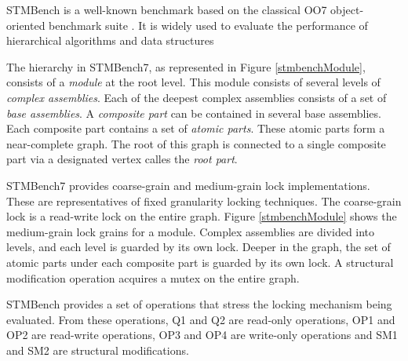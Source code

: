 STMBench is a well-known benchmark based on the classical OO7 object-oriented benchmark suite \cite{CareyDN93}. It is widely used to evaluate the performance of hierarchical algorithms and data structures \cite{prokopec_renaissance_2019,vale_pot_2016, felber_hardware_2016, carvalho_optimizing_2016, kim_scheduling_2015,filipe_nested_2015,rito_props_2014,kalikar2016domlock,anjuMID,FlexiGran2024,KalikarN18,GaneshKN18,liu_unleashing_2014} 

The hierarchy in STMBench7, as represented in Figure \ref{stmbenchModule}, consists of a \emph{module} at the root level. This module consists of several levels of \emph{complex assemblies}. 
Each of the deepest complex assemblies consists of a set of \emph{base assemblies}. 
A \emph{composite part} can be contained in several base assemblies. 
Each composite part contains a set of \emph{atomic parts}. 
These atomic parts form a near-complete graph. 
The root of this graph is connected to a single composite part via a designated vertex calles the \emph{root part}.

STMBench7 provides coarse-grain and medium-grain lock implementations. These are representatives of fixed granularity locking techniques.   
The coarse-grain lock is a read-write lock on the entire graph. 
Figure  \ref{stmbenchModule} shows the medium-grain lock grains for a module. 
Complex assemblies are divided into levels, and each level is guarded by its own lock.
Deeper in the graph, the set of atomic parts under each composite part is guarded by its own lock.
A structural modification operation acquires a mutex on the entire graph.


STMBench provides a set of operations that stress the locking mechanism being evaluated. From these operations, Q1 and Q2 are read-only operations, OP1 and OP2 are read-write operations, OP3 and OP4 are write-only operations and SM1 and SM2 are structural modifications.


